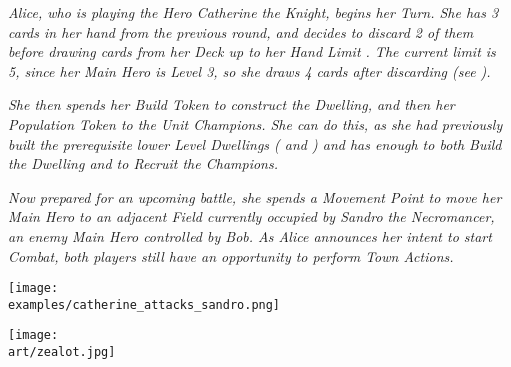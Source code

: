\begin{multicols}{2}
\textit{Alice, who is playing the Hero Catherine the Knight, begins her Turn.
She has 3 cards in her hand from the previous round, and decides to discard 2 of them before drawing cards from her Deck up to her Hand Limit .
The current limit is 5, since her Main Hero is Level 3, so she draws 4 cards after discarding (see ).}\par
\textit{She then spends her Build Token to construct the  Dwelling, and then her Population Token to  the  Unit Champions.
She can do this, as she had previously built the prerequisite lower Level Dwellings ( and ) and has enough  to both Build the Dwelling and to Recruit the Champions.}\par
\textit{Now prepared for an upcoming battle, she spends a Movement Point to move her Main Hero to an adjacent Field currently occupied by Sandro the Necromancer, an enemy Main Hero controlled by Bob.
As Alice announces her intent to start Combat, both players still have an opportunity to perform Town Actions.}\par

\texttt{[image: \\examples/catherine\_attacks\_sandro.png]}

\end{multicols}

\vfill

\begin{scaledfigure}[blanker]
 \centering
 \texttt{[image: \\art/zealot.jpg]}
\end{scaledfigure}
